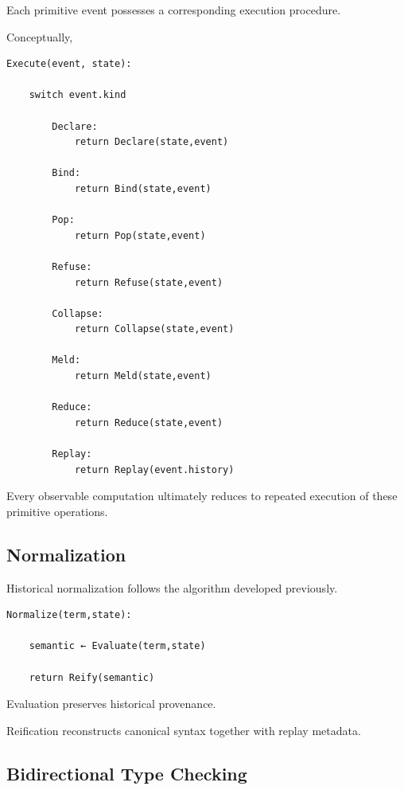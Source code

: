 \documentclass[12pt,oneside]{article}
\theoremstyle{definition}
\theoremstyle{remark}
\begin{document}
Each primitive event possesses a corresponding execution procedure.

Conceptually,

\begin{verbatim}
Execute(event, state):

    switch event.kind

        Declare:
            return Declare(state,event)

        Bind:
            return Bind(state,event)

        Pop:
            return Pop(state,event)

        Refuse:
            return Refuse(state,event)

        Collapse:
            return Collapse(state,event)

        Meld:
            return Meld(state,event)

        Reduce:
            return Reduce(state,event)

        Replay:
            return Replay(event.history)
\end{verbatim}

Every observable computation ultimately reduces to repeated execution of these
primitive operations.


\subsection{Normalization}

Historical normalization follows the algorithm developed previously.

\begin{verbatim}
Normalize(term,state):

    semantic ← Evaluate(term,state)

    return Reify(semantic)
\end{verbatim}

Evaluation preserves historical provenance.

Reification reconstructs canonical syntax together with replay metadata.


\subsection{Bidirectional Type Checking}
\end{document}
